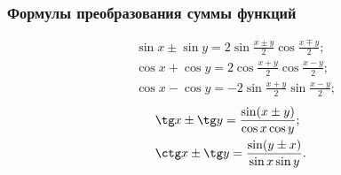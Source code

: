 \subsubsection{Формулы преобразования суммы функций}
\vspace*{-1.8\baselineskip}
\begin{multicols}{2}
\begin{align*}
&\sin x\pm \sin y =2 \sin \frac{x\pm y}{2} \cos \frac{x\mp y}{2};\\
&\cos x + \cos y  = 2 \cos \frac{x + y}{2} \cos \frac{x - y}{2};\\
&\cos x - \cos y  = -2 \sin \frac{x + y}{2} \sin\frac{x - y}{2};
\end{align*}
\vfill
\columnbreak
\begin{align*}
&\tg x \pm \tg y = \frac{\sin (x \pm y)}{ \cos x \cos y};\\
&\ctg x \pm \tg y = \frac{\sin (y \pm x)}{ \sin x \sin y}.
\end{align*}
\end{multicols}